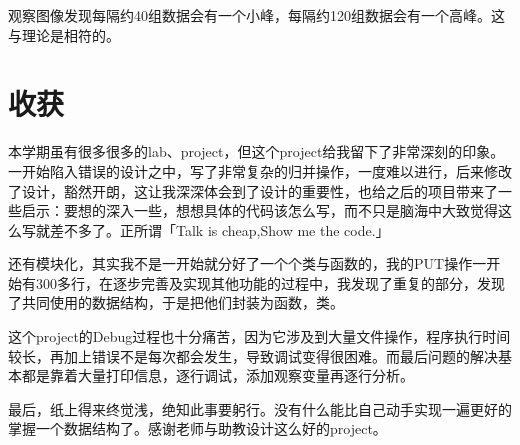 \documentclass[fontset=windows]{article}
\begin{document}
观察图像发现每隔约40组数据会有一个小峰，每隔约120组数据会有一个高峰。这与理论是相符的。
\section{收获}
本学期虽有很多很多的lab、project，但这个project给我留下了非常深刻的印象。一开始陷入错误的设计之中，写了非常复杂的归并操作，一度难以进行，后来修改了设计，豁然开朗，这让我深深体会到了设计的重要性，也给之后的项目带来了一些启示：要想的深入一些，想想具体的代码该怎么写，而不只是脑海中大致觉得这么写就差不多了。正所谓「Talk is cheap,Show me the code.」

还有模块化，其实我不是一开始就分好了一个个类与函数的，我的PUT操作一开始有300多行，在逐步完善及实现其他功能的过程中，我发现了重复的部分，发现了共同使用的数据结构，于是把他们封装为函数，类。

这个project的Debug过程也十分痛苦，因为它涉及到大量文件操作，程序执行时间较长，再加上错误不是每次都会发生，导致调试变得很困难。而最后问题的解决基本都是靠着大量打印信息，逐行调试，添加观察变量再逐行分析。

最后，纸上得来终觉浅，绝知此事要躬行。没有什么能比自己动手实现一遍更好的掌握一个数据结构了。感谢老师与助教设计这么好的project。
\end{document}
